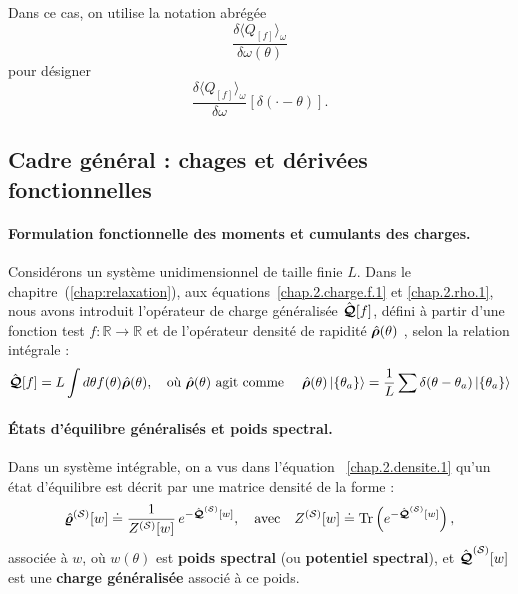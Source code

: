 Dans ce cas, on utilise la notation abrégée
\[
\frac{\delta \langle Q_{[f]} \rangle_{\omega} }{\delta \omega(\theta)}
\]
pour désigner
\[
\frac{\delta \langle Q_{[f]} \rangle_{\omega} }{\delta \omega}[\delta(\cdot - \theta)].
\]


\subsection{Cadre général : chages et dérivées fonctionnelles}


\begin{mdframed}[
	linewidth=0.5pt, 
	backgroundcolor=gray!5, 
	roundcorner=50pt,	
	innerleftmargin=5pt,
    innerrightmargin=5pt,
    innertopmargin=-10pt,
    innerbottommargin=2pt,
    leftmargin=2pt,
    rightmargin=2pt
	]
\paragraph{Formulation fonctionnelle des moments et cumulants des charges.}
Considérons un système unidimensionnel de taille finie $L$. 
Dans le chapitre~(\ref{chap:relaxation}), aux équations~\eqref{chap.2.charge.f.1} et \eqref{chap.2.rho.1}, nous avons introduit l’opérateur de charge généralisée $\hat{\bm{\mathcal{Q}}}[f]$, défini à partir d'une fonction test $f \colon \mathbb{R} \to \mathbb{R}$ et de l'opérateur densité de rapidité  $\hat{\bm{\rho}}(\theta)$ , selon la relation intégrale :
\begin{eqnarray}\label{chap4:eq.charge.q.1}
	\hat{\bm{\mathcal{Q}}}[f] = L\int d\theta f(\theta) \hat{\bm{\rho}}(\theta),\quad \text{où $\hat{\bm{\rho}}(\theta)$ agit comme } \quad \hat{\bm{\rho}}(\theta) \ket{ \{ \theta_a \} } = \frac{1}{L} \sum \delta ( \theta - \theta_a ) \ket{ \{ \theta_a \} }
\end{eqnarray}

\paragraph{États d'équilibre généralisés et poids spectral.}
Dans un système intégrable, on a vus dans l'équation ~\eqref{chap.2.densite.1} qu'un état d’équilibre est décrit par une matrice densité de la forme :
\begin{eqnarray}
	\hat{\bm{\varrho}}^{(\mathcal{S})}[w] \doteq  \frac{1}{Z^{(\mathcal{S})}[w]}\, e^{-\hat{\bm{\mathcal{Q}}}^{(\mathcal{S})}[w]},\quad \text{avec} \quad Z^{(\mathcal{S})}[w] \doteq \mathrm{Tr}\left(e^{-\hat{\bm{\mathcal{Q}}}^{(\mathcal{S})}[w]}\right),
\end{eqnarray}
associée à $w$, où \( w(\theta) \) est {\bf poids spectral} (ou {\bf potentiel spectral}), et   \( \hat{\bm{\mathcal{Q}}}^{(\mathcal{S})}[w] \) est une {\bf charge généralisée} associé à ce poids.
\end{mdframed}

